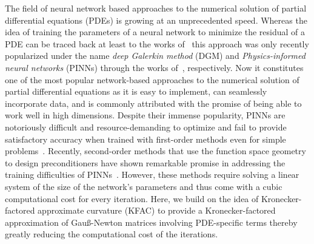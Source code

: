 
The field of neural network based approaches to the numerical solution of partial differential equations (PDEs) is growing at an unprecedented speed. %
Whereas the idea of training the parameters of a neural network to minimize the residual of a PDE can be traced back at least to the works of~\cite{dissanayake1994neural, lagaris1998artificial} this approach was only recently popularized under the name \emph{deep Galerkin method} (DGM) and \emph{Physics-informed neural networks} (PINNs) through the works of~\cite{sirignano2018dgm, raissi2019physics}, respectively.  
Now it constitutes one of the most popular network-based approaches to the numerical solution of partial differential equations as it is easy to implement, can seamlessly incorporate data, and is commonly attributed with the promise of being able to work well in high dimensions. 
Despite their immense popularity, PINNs are notoriously difficult and resource-demanding to optimize \citep{wang2021understanding}%
and fail to provide satisfactory accuracy when trained with first-order methods even for simple problems~\citep{zeng2022competitive, muller2023achieving}. 
Recently, second-order methods that use the function space geometry to design preconditioners have shown remarkable promise in addressing the training difficulties of PINNs~\citep{zeng2022competitive, muller2023achieving, de2023operator,jnini2024gauss, muller2024optimization}. 
However, these methods require solving a linear system of the size of the network's parameters and thus come with a cubic computational cost for every iteration. %
Here, we build on the idea of Kronecker-factored approximate curvature (KFAC) to provide a %
Kronecker-factored approximation of Gauß-Newton matrices involving PDE-specific terms thereby greatly reducing the computational cost of the iterations. %

